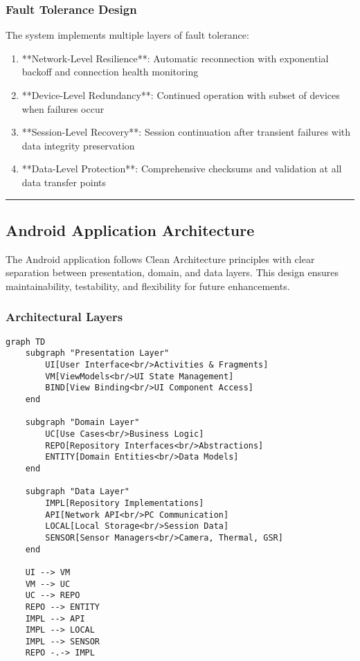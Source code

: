\documentclass[12pt,a4paper]{article}
\begin{document}
\subsubsection{Fault Tolerance Design}

The system implements multiple layers of fault tolerance:

\begin{enumerate}
\item **Network-Level Resilience**: Automatic reconnection with exponential backoff and connection health monitoring
\item **Device-Level Redundancy**: Continued operation with subset of devices when failures occur
\item **Session-Level Recovery**: Session continuation after transient failures with data integrity preservation
\item **Data-Level Protection**: Comprehensive checksums and validation at all data transfer points

\end{enumerate}
\hrule

\subsection{Android Application Architecture}

The Android application follows Clean Architecture principles with clear separation between presentation, domain, and
data layers. This design ensures maintainability, testability, and flexibility for future enhancements.

\subsubsection{Architectural Layers}

\begin{verbatim}
graph TD
    subgraph "Presentation Layer"
        UI[User Interface<br/>Activities & Fragments]
        VM[ViewModels<br/>UI State Management]
        BIND[View Binding<br/>UI Component Access]
    end

    subgraph "Domain Layer"
        UC[Use Cases<br/>Business Logic]
        REPO[Repository Interfaces<br/>Abstractions]
        ENTITY[Domain Entities<br/>Data Models]
    end

    subgraph "Data Layer"
        IMPL[Repository Implementations]
        API[Network API<br/>PC Communication]
        LOCAL[Local Storage<br/>Session Data]
        SENSOR[Sensor Managers<br/>Camera, Thermal, GSR]
    end

    UI --> VM
    VM --> UC
    UC --> REPO
    REPO --> ENTITY
    IMPL --> API
    IMPL --> LOCAL
    IMPL --> SENSOR
    REPO -.-> IMPL
\end{verbatim}
\end{document}
